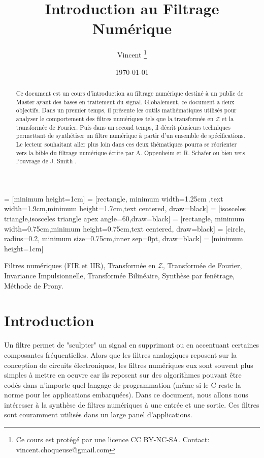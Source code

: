 \documentclass[11pt,a4paper]{IEEEtran}
\author{Vincent \thanks{Ce cours est protégé par une licence CC BY-NC-SA. Contact: vincent.choqueuse@gmail.com}}
\title{Introduction au Filtrage Numérique}
\date{\today}
\begin{document}
\maketitle

 = [minimum height=1cm]
 = [rectangle, minimum width=1.25cm ,text width=1.9cm,minimum height=1.7cm,text centered, draw=black]
 = [isosceles triangle,isosceles triangle apex angle=60,draw=black]
 = [rectangle, minimum width=0.75cm,minimum height=0.75cm,text centered, draw=black]
 = [circle, radius=0.2, minimum size=0.75cm,inner sep=0pt, draw=black]
 = [minimum height=1cm]


\begin{abstract}
Ce document est un cours d'introduction au filtrage numérique destiné à un public de Master ayant des bases en traitement du signal. Globalement, ce document a deux objectifs. Dans un premier temps, il présente les outils mathématiques utilisés pour analyser le comportement des filtres numériques tels que la transformée en $\mathcal{Z}$ et la transformée de Fourier. Puis dans un second temps, il décrit plusieurs techniques permettant de synthétiser un filtre numérique à partir d'un ensemble de spécifications. Le lecteur souhaitant aller plus loin dans ces deux thématiques pourra se réorienter vers la bible du filtrage numérique écrite par A. Oppenheim et R. Schafer \cite{opp} ou bien vers l'ouvrage de J. Smith \cite{smi}.
\end{abstract}

\begin{keywords}
Filtres numériques (FIR et IIR), Transformée en $\mathcal{Z}$, Transformée de Fourier, Invariance Impulsionnelle, Transformée Bilinéaire, Synthèse par fenêtrage, Méthode de Prony.
\end{keywords}

\section{Introduction}



Un filtre permet de "sculpter" un signal en supprimant ou en accentuant certaines composantes fréquentielles. Alors que les filtres analogiques reposent sur la conception de circuits électroniques, les filtres numériques eux sont souvent plus simples à mettre en oeuvre car ils reposent sur des algorithmes pouvant être codés dans n'importe quel langage de programmation (même si le C reste la norme pour les applications embarquées). Dans ce document, nous allons nous intéresser à la synthèse de filtres numériques à une entrée et une sortie. Ces filtres sont couramment utilisés dans un large panel d'applications. 
\end{document}
